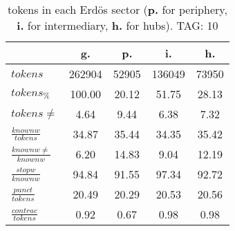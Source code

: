 \begin{table}[h!]
\begin{center}
\begin{tabular}{| l || c | c | c | c |}\hline
 & {\bf g.} & {\bf p.} & {\bf i.} & {\bf h.} \\\hline\hline
$tokens$ & 262904  & 52905  & 136049  & 73950 \\
$tokens_{\%}$ & 100.00  & 20.12  & 51.75  & 28.13 \\
$tokens \neq$ & 4.64  & 9.44  & 6.38  & 7.32 \\\hline
$\frac{knownw}{tokens}$ & 34.87  & 35.44  & 34.35  & 35.42 \\
$\frac{knownw \neq}{knownw}$ & 6.20  & 14.83  & 9.04  & 12.19 \\\hline
$\frac{stopw}{knownw}$ & 94.84  & 91.55  & 97.34  & 92.72 \\
$\frac{punct}{tokens}$ & 20.49  & 20.29  & 20.53  & 20.56 \\
$\frac{contrac}{tokens}$ & 0.92  & 0.67  & 0.98  & 0.98 \\\hline
\end{tabular}
\caption{tokens in each Erd\"os sector ({{\bf p.}} for periphery, {{\bf i.}} for intermediary, 
    {{\bf h.}} for hubs). TAG: 10}
\end{center}
\end{table}